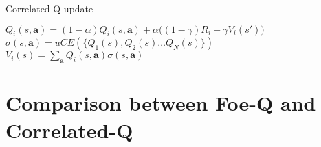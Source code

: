 \documentclass[conference]{IEEEtran}
\begin{document}
\begin{algorithm}[h!]
	\caption{Correlated-Q update}
	\begin{algorithmic}
			\State $Q_i(s, \mathbf{a}) = (1-\alpha) Q_i(s, \mathbf{a}) + \alpha  \big( (1-\gamma) R_i + \gamma V_i(s') \big)$
		\EndFor
		\State $\sigma(s, \mathbf{a}) = uCE(\{Q_1(s), Q_2(s)\dots Q_N(s)\})$ 
		\State $V_i(s) = \sum_{\mathbf{a}} Q_i(s, \mathbf{a}) \sigma(s, \mathbf{a})$
		\EndFor
		\EndFunction
	\end{algorithmic}
	\label{algo:ce-Q}
\end{algorithm}


\section{Comparison between Foe-Q and Correlated-Q}

	


\end{document}
